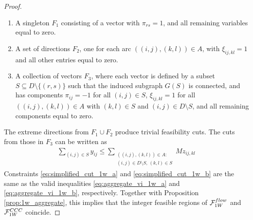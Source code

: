 \documentclass[10pt,a4paper]{amsart}
\newcommand{\countvar}[4]{z_{#1#2,#3#4}}
\newcommand{\drivevar}[2]{y_{#1#2}}
\newcommand{\grid}{G}
\newcommand{\gridarcset}{A}
\newcommand{\validdriveset}{D}
\begin{document}
\begin{proof}
\begin{enumerate}
\item A singleton $F_1$ consisting of a vector with $\pi_{rs} = 1$, and all remaining variables equal to zero.
\item A set of directions $F_2$, one for each arc $((i,j),(k,l)) \in \gridarcset$, with $\xi_{ij,kl} = 1$ and all other entries equal to zero.
\item A collection of vectors $F_3$, where each vector is defined by a subset 
$S \subseteq \validdriveset \setminus \{(r,s)\}$ such that the induced subgraph 
$\grid(S)$ is connected, and has components 
$\pi_{ij} = -1$ for all $(i,j) \in S$, 
$\xi_{ij,kl} = 1$ for all $((i,j),(k,l)) \in \gridarcset$ with $(k,l) \in S$ and $(i,j) \in \validdriveset \setminus S$, 
and all remaining components equal to zero.
\end{enumerate}
The extreme directions from $F_1 \cup F_2$ produce trivial feasibility cuts. The cuts from those in $F_3$ can be written as
\begin{align}
\sum_{(i,j) \in S} \drivevar{i}{j} \leq  \sum_{\substack{
  ((i,j),(k,l)) \in \gridarcset:\\
  (i,j) \in D \setminus S,\,
  (k,l) \in S
}} M \countvar{i}{j}{k}{l}  \label{eq:simplified_cut_1w_b}
\end{align}
Constraints \eqref{eq:simplified_cut_1w_a} and \eqref{eq:simplified_cut_1w_b} are the same as the valid inequalities \eqref{eq:aggregate_vi_1w_a} and \eqref{eq:aggregate_vi_1w_b}, respectively. Together with Proposition \ref{prop:1w_aggregate}, this implies that the integer feasible regions of $\mathcal{F}_{\textsc{1W}}^{\textsc{flow}}$ and $\mathcal{F}_{\textsc{1W}}^{\textsc{CCC}}$ coincide.
\end{proof}
\end{document}
